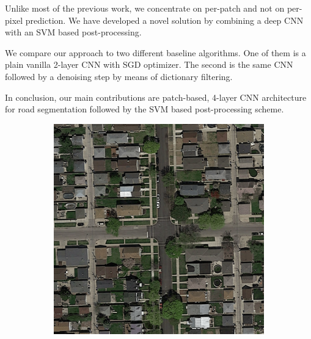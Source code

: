 \documentclass[10pt,conference,compsocconf]{IEEEtran}
\begin{document}
Unlike most of the previous work, we concentrate on per-patch and not on per-pixel prediction. We have developed a novel solution by combining a deep CNN with an SVM based post-processing.

We compare our approach to two different baseline algorithms. One of them is a plain vanilla 2-layer CNN with SGD optimizer. The second is the same CNN followed by a denoising step by means of dictionary filtering.

In conclusion, our main contributions are patch-based, \mbox{4-layer} CNN architecture for road segmentation followed by the SVM based post-processing scheme. 

\begin{figure}[]
	\label{fig:intro_example}
	\centering
	\begin{subfigure}{.2\textwidth}
		\includegraphics[width=1\textwidth]{figs/img1.png}
	\end{subfigure}
	\begin{subfigure}{.2\textwidth}

\end{subfigure}
\end{figure}
\end{document}
